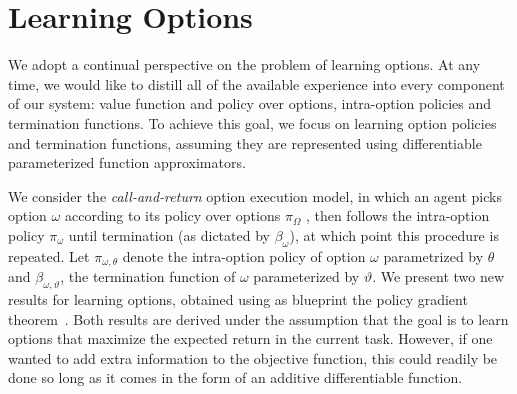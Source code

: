 \documentclass[letterpaper]{article}
\def\option{\omega}
\begin{document}
 \section{Learning Options}\label{sect:learning}
We adopt a  continual perspective on the problem of learning
options. At any time, we would like to distill all of the available
experience into every component of our system: value function and policy over
options, intra-option policies and termination functions.
To achieve this goal, we focus on learning option policies and termination
functions, assuming they are represented using differentiable parameterized
function approximators.

We consider the \textit{call-and-return} option execution model,
in which an agent picks option $\omega$ according to its policy over options
$\pi_\Omega$ , then follows the intra-option policy $\pi_{\omega}$ until termination
(as dictated by $\beta_{\omega}$), at which point this procedure is repeated.
Let $\pi_{\option, \theta}$ denote the intra-option policy of option
$\option$ parametrized by $\theta$ and  $\beta_{\option, \vartheta}$,
the termination function of $\option$ parameterized by $\vartheta$.
We present two new results for learning options,
obtained using as blueprint the policy gradient theorem~\cite{Sutton1999pg}.
Both results are derived under the assumption that the goal is to learn options
that maximize the expected return in the current task. However, if one wanted to add
extra information to the objective function, this could readily be done so long
as it comes in the form of an additive differentiable function.
\end{document}
